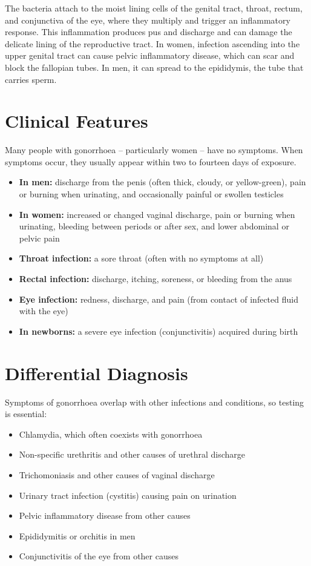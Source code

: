 The bacteria attach to the moist lining cells of the genital tract, throat, rectum, and conjunctiva of the eye, where they multiply and trigger an inflammatory response. This inflammation produces pus and discharge and can damage the delicate lining of the reproductive tract. In women, infection ascending into the upper genital tract can cause pelvic inflammatory disease, which can scar and block the fallopian tubes. In men, it can spread to the epididymis, the tube that carries sperm.

\section*{Clinical Features}
Many people with gonorrhoea -- particularly women -- have no symptoms. When symptoms occur, they usually appear within two to fourteen days of exposure.

\begin{itemize}
    \item \textbf{In men:} discharge from the penis (often thick, cloudy, or yellow-green), pain or burning when urinating, and occasionally painful or swollen testicles
    \item \textbf{In women:} increased or changed vaginal discharge, pain or burning when urinating, bleeding between periods or after sex, and lower abdominal or pelvic pain
    \item \textbf{Throat infection:} a sore throat (often with no symptoms at all)
    \item \textbf{Rectal infection:} discharge, itching, soreness, or bleeding from the anus
    \item \textbf{Eye infection:} redness, discharge, and pain (from contact of infected fluid with the eye)
    \item \textbf{In newborns:} a severe eye infection (conjunctivitis) acquired during birth
\end{itemize}

\section*{Differential Diagnosis}
Symptoms of gonorrhoea overlap with other infections and conditions, so testing is essential:

\begin{itemize}
    \item Chlamydia, which often coexists with gonorrhoea
    \item Non-specific urethritis and other causes of urethral discharge
    \item Trichomoniasis and other causes of vaginal discharge
    \item Urinary tract infection (cystitis) causing pain on urination
    \item Pelvic inflammatory disease from other causes
    \item Epididymitis or orchitis in men
    \item Conjunctivitis of the eye from other causes
\end{itemize}

